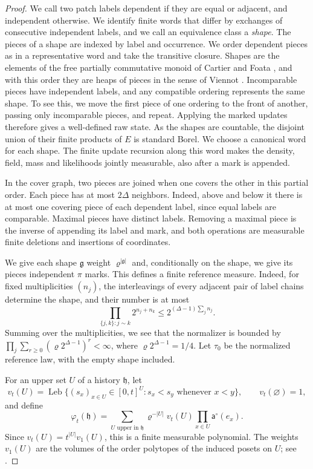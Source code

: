 \begin{proof}
We call two patch labels dependent if they are equal or adjacent, and
independent otherwise. We identify finite words that differ by exchanges
of consecutive independent labels, and we call an equivalence class a
\emph{shape}. The pieces of a shape are indexed by label and occurrence.
We order dependent pieces as in a representative word and take the
transitive closure. Shapes are the elements of the free partially
commutative monoid of Cartier and Foata \cite{CartierFoata1969}, and
with this order they are heaps of pieces in the sense of Viennot
\cite[Section~3]{Viennot1986}.
Incomparable pieces have independent labels, and any compatible ordering
represents the same shape. To see this, we move the first piece of one
ordering to the front of another, passing only incomparable pieces, and
repeat. Applying the marked updates therefore gives a well-defined raw
state. As the shapes are countable, the disjoint union of their finite
products of $E$ is standard Borel. We choose a canonical word for each
shape. The finite update recursion along this word makes the density,
field, mass and likelihoods jointly measurable, also after a mark is
appended.

In the cover graph, two pieces are joined when one covers the other in
this partial order. Each piece has at most $2\Delta$ neighbors. Indeed,
above and below it there is at most one covering piece of each dependent
label, since equal labels are comparable. Maximal pieces have distinct
labels. Removing a maximal piece is the inverse of appending its label
and mark, and both operations are measurable finite deletions and
insertions of coordinates.

We give each shape $\mathfrak g$ weight $\varrho^{|\mathfrak g|}$
and, conditionally on the shape, we give its pieces independent $\pi$
marks. This defines a finite reference measure. Indeed, for fixed
multiplicities $(n_j)$, the interleavings of every adjacent pair of
label chains determine the shape, and their number is at most
\[
 \prod_{\{j,k\}:j\sim k}2^{n_j+n_k}
 \le2^{(\Delta-1)\sum_jn_j}.
\]
Summing over the multiplicities, we see that the normalizer is bounded
by $\prod_j\sum_{r\ge0}(\varrho2^{\Delta-1})^r<\infty$, where
$\varrho2^{\Delta-1}=1/4$. Let $\tau_0$ be the normalized reference
law, with the empty shape included.

For an upper set $U$ of a history $\mathfrak h$, let
\[
 v_t(U)=\operatorname{Leb}\{(s_x)_{x\in U}\in[0,t]^U:
                    s_x<s_y\text{ whenever }x<y\},\qquad
 v_t(\varnothing)=1,
\]
and define
\begin{equation}\label{eq:LB-density}
 \varphi_t(\mathfrak h)=
 \sum_{U\text{ upper in }\mathfrak h}
 \varrho^{-|U|}v_t(U)\prod_{x\in U}\mathsf a^\circ(e_x).
\end{equation}
Since $v_t(U)=t^{|U|}v_1(U)$, this is a finite measurable polynomial.
The weights $v_1(U)$ are the volumes of the order polytopes of the
induced posets on $U$; see \cite[Section~1, Corollary~4.2]{Stanley1986}.


\end{proof}
